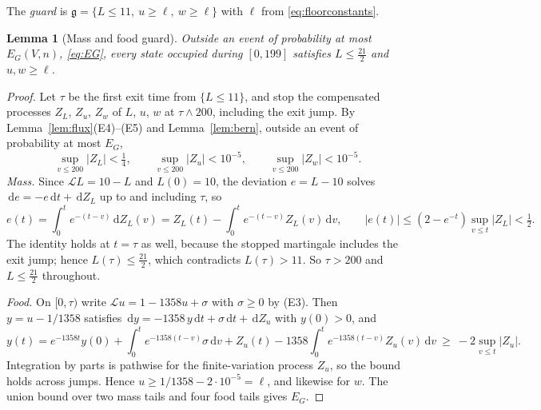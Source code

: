 \documentclass[11pt,letterpaper]{article}
\theoremstyle{plain}
\newtheorem{lemma}[theorem]{Lemma}
\theoremstyle{definition}
\theoremstyle{remark}
\numberwithin{equation}{section}
\newcommand{\cL}{\mathcal L}
\newcommand{\dd}{\,\mathrm d}
\begin{document}
The \emph{guard} is $\mathfrak g=\{L\le11,\ u\ge\ell,\ w\ge\ell\}$ with $\ell$ from \eqref{eq:floorconstants}.

\begin{lemma}[Mass and food guard]\label{lem:guard}
Outside an event of probability at most $E_G(V,n)$, \eqref{eq:EG}, every state occupied during $[0,199]$ satisfies $L\le\tfrac{21}2$ and $u,w\ge\ell$.
\end{lemma}
\begin{proof}
Let $\tau$ be the first exit time from $\{L\le11\}$, and stop the compensated processes $Z_L$, $Z_u$, $Z_w$ of $L$, $u$, $w$ at $\tau\wedge200$, including the exit jump. By Lemma~\ref{lem:flux}(E4)--(E5) and Lemma~\ref{lem:bern}, outside an event of probability at most $E_G$,
\[
 \sup_{v\le200}|Z_L|<\tfrac14,\qquad \sup_{v\le200}|Z_u|<10^{-5},\qquad \sup_{v\le200}|Z_w|<10^{-5}.
\]
\emph{Mass.} Since $\cL L=10-L$ and $L(0)=10$, the deviation $e=L-10$ solves $\dd e=-e\dd t+\dd Z_L$ up to and including $\tau$, so
\begin{equation}\label{eq:ou}
 e(t)=\int_0^te^{-(t-v)}\dd Z_L(v)=Z_L(t)-\int_0^te^{-(t-v)}Z_L(v)\dd v,\qquad |e(t)|\le(2-e^{-t})\sup_{v\le t}|Z_L|<\tfrac12 .
\end{equation}
The identity holds at $t=\tau$ as well, because the stopped martingale includes the exit jump; hence $L(\tau)\le\frac{21}2$, which contradicts $L(\tau)>11$. So $\tau>200$ and $L\le\frac{21}2$ throughout.

\emph{Food.} On $[0,\tau)$ write $\cL u=1-1358u+\sigma$ with $\sigma\ge0$ by (E3). Then $y=u-1/1358$ satisfies $\dd y=-1358\,y\dd t+\sigma\dd t+\dd Z_u$ with $y(0)>0$, and
\[
 y(t)=e^{-1358t}y(0)+\int_0^te^{-1358(t-v)}\sigma\dd v+Z_u(t)-1358\int_0^te^{-1358(t-v)}Z_u(v)\dd v\ \ge\ -2\sup_{v\le t}|Z_u| .
\]
Integration by parts is pathwise for the finite-variation process $Z_u$, so the bound holds across jumps. Hence $u\ge1/1358-2\cdot10^{-5}=\ell$, and likewise for $w$. The union bound over two mass tails and four food tails gives $E_G$.
\end{proof}
\end{document}

